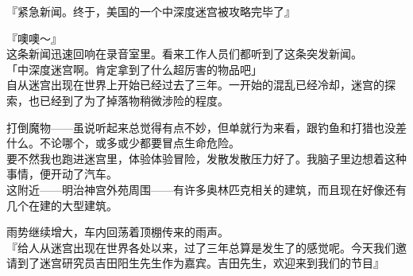 『紧急新闻。终于，美国的一个中深度迷宫被攻略完毕了』

『噢噢～』\\

这条新闻迅速回响在录音室里。看来工作人员们都听到了这条突发新闻。\\

「中深度迷宫啊。肯定拿到了什么超厉害的物品吧」\\

自从迷宫出现在世界上开始已经过去了三年。一开始的混乱已经冷却，迷宫的探索，也已经到了为了掉落物稍微涉险的程度。

打倒魔物——虽说听起来总觉得有点不妙，但单就行为来看，跟钓鱼和打猎也没差什么。不论哪个，或多或少都要冒点生命危险。\\

要不然我也跑进迷宫里，体验体验冒险，发散发散压力好了。我脑子里边想着这种事情，便开动了汽车。\\

这附近——明治神宫外苑周围——有许多奥林匹克相关的建筑，而且现在好像还有几个在建的大型建筑。

雨势继续增大，车内回荡着顶棚传来的雨声。\\

『给人从迷宫出现在世界各处以来，过了三年总算是发生了的感觉呢。今天我们邀请到了迷宫研究员吉田阳生先生作为嘉宾。吉田先生，欢迎来到我们的节目』\\

